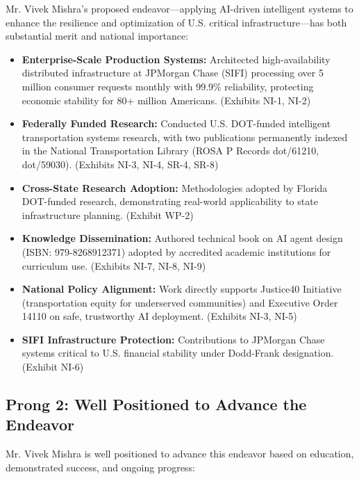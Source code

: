 \documentclass[11pt]{article}
\newcommand{\dr}{Mr. Vivek Mishra }
\newcommand{\drs}{Mr. Vivek Mishra's }
\begin{document}
\drs proposed endeavor—applying AI-driven intelligent systems to enhance the resilience and optimization of U.S. critical infrastructure—has both substantial merit and national importance:

\begin{itemize}
    \item \textbf{Enterprise-Scale Production Systems:} Architected high-availability distributed infrastructure at JPMorgan Chase (SIFI) processing over 5 million consumer requests monthly with 99.9\% reliability, protecting economic stability for 80+ million Americans. (Exhibits NI-1, NI-2)
    
    \item \textbf{Federally Funded Research:} Conducted U.S. DOT-funded intelligent transportation systems research, with two publications permanently indexed in the National Transportation Library (ROSA P Records dot/61210, dot/59030). (Exhibits NI-3, NI-4, SR-4, SR-8)
    
    \item \textbf{Cross-State Research Adoption:} Methodologies adopted by Florida DOT-funded research, demonstrating real-world applicability to state infrastructure planning. (Exhibit WP-2)
    
    \item \textbf{Knowledge Dissemination:} Authored technical book on AI agent design (ISBN: 979-8268912371) adopted by accredited academic institutions for curriculum use. (Exhibits NI-7, NI-8, NI-9)
    
    \item \textbf{National Policy Alignment:} Work directly supports Justice40 Initiative (transportation equity for underserved communities) and Executive Order 14110 on safe, trustworthy AI deployment. (Exhibits NI-3, NI-5)
    
    \item \textbf{SIFI Infrastructure Protection:} Contributions to JPMorgan Chase systems critical to U.S. financial stability under Dodd-Frank designation. (Exhibit NI-6)
\end{itemize}

\subsection{Prong 2: Well Positioned to Advance the Endeavor}

\dr is well positioned to advance this endeavor based on education, demonstrated success, and ongoing progress:
\end{document}
